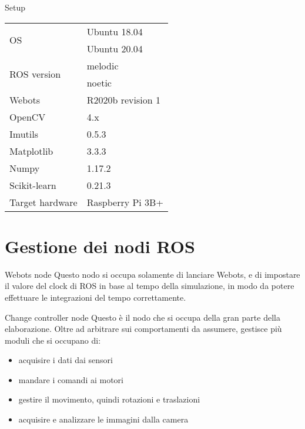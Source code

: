 \documentclass[10pt]{beamer}
\begin{document}
	\begin{frame}{Setup}
	\centering
	\begin{tabular}{|l|l|}
		\hline
		\multirow{2}{4em}{OS} & Ubuntu 18.04 \\
							  & Ubuntu 20.04 \\ \hline
		\multirow{2}{6em}{ROS version} & melodic \\
									   & noetic \\ \hline
		Webots	& R2020b revision 1\\ \hline
		OpenCV~\cite{opencv} 	& 4.x \\\hline
		Imutils~\cite{imutils} & 0.5.3 \\\hline
		Matplotlib~\cite{matplotlib} & 3.3.3 \\\hline
		Numpy~\cite{numpy} & 1.17.2 \\\hline
		Scikit-learn~\cite{scikit} & 0.21.3\\\hline
		{Target hardware}  & Raspberry Pi 3B+ \\ \hline
	\end{tabular}
	\end{frame}


	\section{Gestione dei nodi ROS}\label{sec:Ros}
	\frame{\sectionpage}


	\begin{frame}{Webots node}
	Questo nodo si occupa solamente di lanciare Webots, e di impostare il
	valore del clock di ROS in base al tempo della simulazione, in modo da
	potere effettuare le integrazioni del tempo correttamente.
	\end{frame}
	\begin{frame}{Change controller node}
	Questo è il nodo che si occupa della gran parte della elaborazione. Oltre
	ad arbitrare sui comportamenti da assumere, gestisce più moduli che si
	occupano di: 
	\begin{itemize}
		\item acquisire i dati dai sensori
		\item mandare i comandi ai motori
		\item gestire il movimento, quindi rotazioni e traslazioni
		\item acquisire e analizzare le immagini dalla camera
	\end{itemize}
	\end{frame}
\end{document}
